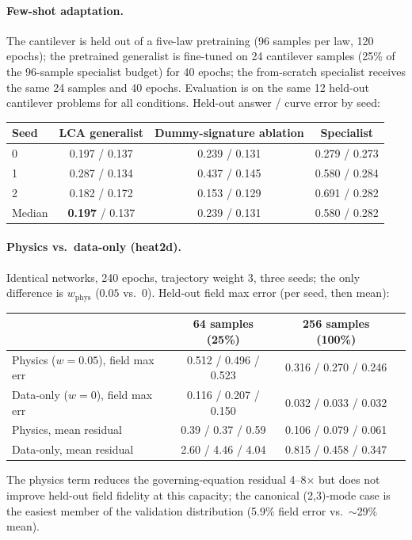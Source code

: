 \documentclass[11pt,a4paper]{article}
\begin{document}
\paragraph{Few-shot adaptation.} The cantilever is held out of a five-law
pretraining (96 samples per law, 120 epochs); the pretrained generalist is
fine-tuned on 24 cantilever samples (25\% of the 96-sample specialist
budget) for 40 epochs; the from-scratch specialist receives the same 24
samples and 40 epochs. Evaluation is on the same 12 held-out cantilever
problems for all conditions. Held-out answer / curve error by seed:
\begin{center}\small\begin{tabular}{@{}lccc@{}}
\toprule
Seed & LCA generalist & Dummy-signature ablation & Specialist \\
\midrule
0 & 0.197 / 0.137 & 0.239 / 0.131 & 0.279 / 0.273 \\
1 & 0.287 / 0.134 & 0.437 / 0.145 & 0.580 / 0.284 \\
2 & 0.182 / 0.172 & 0.153 / 0.129 & 0.691 / 0.282 \\
Median & \textbf{0.197} / 0.137 & 0.239 / 0.131 & 0.580 / 0.282 \\
\bottomrule
\end{tabular}\end{center}

\paragraph{Physics vs.\ data-only (heat2d).} Identical networks, 240 epochs,
trajectory weight 3, three seeds; the only difference is
$w_{\mathrm{phys}}$ ($0.05$ vs.\ $0$). Held-out field max error (per seed,
then mean):
\begin{center}\small\begin{tabular}{@{}lccc@{}}
\toprule
 & 64 samples (25\%) & 256 samples (100\%) \\
\midrule
Physics ($w{=}0.05$), field max err & 0.512 / 0.496 / 0.523 & 0.316 / 0.270 / 0.246 \\
Data-only ($w{=}0$), field max err & 0.116 / 0.207 / 0.150 & 0.032 / 0.033 / 0.032 \\
Physics, mean residual & 0.39 / 0.37 / 0.59 & 0.106 / 0.079 / 0.061 \\
Data-only, mean residual & 2.60 / 4.46 / 4.04 & 0.815 / 0.458 / 0.347 \\
\bottomrule
\end{tabular}\end{center}
The physics term reduces the governing-equation residual 4--8$\times$ but
does not improve held-out field fidelity at this capacity; the canonical
(2,3)-mode case is the easiest member of the validation distribution (5.9\%
field error vs.\ $\sim$29\% mean).
\end{document}
